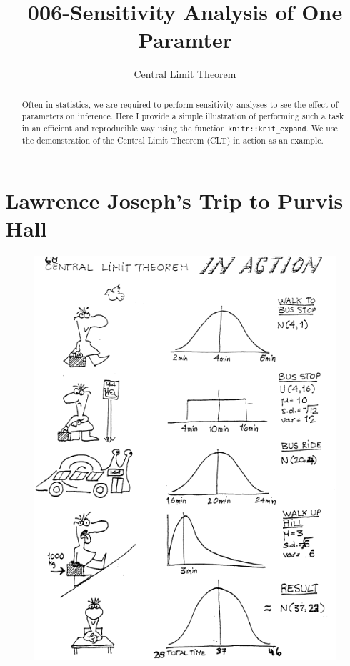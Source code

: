 \documentclass[11pt,letter]{article}\usepackage[]{graphicx}\usepackage[]{color}
\begin{document}
\pagestyle{fancy}

\title{006-Sensitivity Analysis of One Paramter}
\author{Central Limit Theorem}
\maketitle







\begin{abstract}
Often in statistics, we are required to perform sensitivity analyses to see the effect of parameters on inference. Here I provide a simple illustration of performing such a task in an efficient and reproducible way using the function \texttt{knitr::knit\_expand}. We use the demonstration of the Central Limit Theorem (CLT) in action as an example.
\end{abstract}


\section{Lawrence Joseph's Trip to Purvis Hall}
\begin{figure}[h!]
\centering
\includegraphics[scale=1, keepaspectratio]{./clt}
\end{figure}
\end{document}
